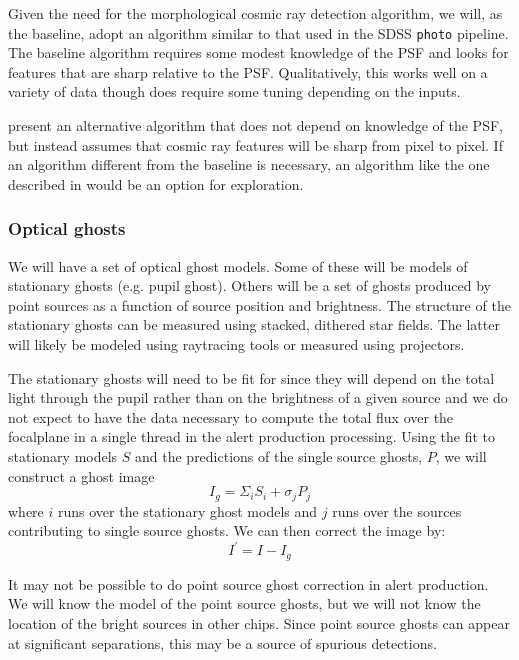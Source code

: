 Given the need for the morphological cosmic ray detection algorithm, we will, as the baseline, adopt an algorithm similar to that used in the SDSS \texttt{photo} pipeline.  The baseline algorithm requires some modest knowledge of the PSF and looks for features that are sharp relative to the PSF.  Qualitatively, this works well on a variety of data though does require some tuning depending on the inputs.

\cite{2001PASP..113.1420V} present an alternative algorithm that does not depend on knowledge of the PSF, but instead assumes that cosmic ray features will be sharp from pixel to pixel. If an algorithm different from the baseline is necessary, an algorithm like the one described in \cite{2001PASP..113.1420V} would be an option for exploration.

\subsubsection{Optical ghosts}
We will have a set of optical ghost models.  Some of these will be models of stationary ghosts (e.g. pupil
ghost). Others will be a set of ghosts produced by point sources as a function of source position and
brightness. The structure of the stationary ghosts can be measured using stacked, dithered star fields.  The latter will likely be modeled using raytracing tools or measured using projectors.

The stationary ghosts will need to be fit for since they will depend on the total light through the pupil rather than on the brightness of a given source and we do not expect to have the data necessary to compute the total flux over the focalplane in a single thread in the alert production processing.  Using the fit to stationary models $S$ and the predictions of the single source ghosts, $P$, we will construct a ghost image
\[
I_g = \Sigma_i S_i + \sigma_j P_{j}
\]
where $i$ runs over the stationary ghost models and $j$ runs over the sources contributing to single source ghosts.  We can then correct the image by:
\[
I^\prime = I - I_g
\]

\begin{note}
It may not be possible to do point source ghost correction in alert production.  We will know the model of the
point source ghosts, but we will not know the location of the bright sources in other chips.  Since point
source ghosts can appear at significant separations, this may be a source of spurious detections.
\end{note}

